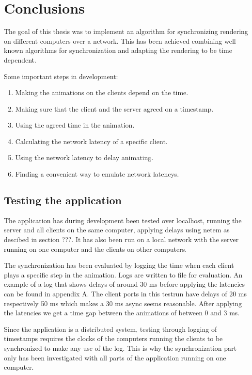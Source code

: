 \chapter{Conclusions}
The goal of this thesis was to implement an algorithm for synchronizing rendering on different computers over a network. This has been achieved combining well known algorithms for synchronization and adapting the rendering to be time dependent. 

Some important steps in development:
\begin{enumerate}
  \item Making the animations on the clients depend on the time. 
  \item Making sure that the client and the server agreed on a timestamp.
  \item Using the agreed time in the animation.
  \item Calculating the network latency of a specific client.
  \item Using the network latency to delay animating. 
  \item Finding a convenient way to emulate network latencys.
\end{enumerate}

\section {Testing the application}
The application has during development been tested over localhost, running the server and all clients on the same computer, applying delays using netem as descibed in section ???. It has also been run on a local network with the server running on one computer and the clients on other computers. 

The synchronization has been evaluated by logging the time when each client plays a specific step in the animation. Logs are written to file for evaluation. An example of a log that shows delays of around 30 ms before applying the latencies can be found in appendix A. The client ports in this testrun have delays of 20 ms respectively 50 ms which makes a 30 ms async seems reasonable. After applying the latencies we get a time gap between the animations of between 0 and 3 ms. 

Since the application is a distributed system, testing through logging of timestamps requires the clocks of the computers running the clients to be synchronized to make any use of the log. This is why the synchronization part only has been investigated with all parts of the application running on one computer. 

